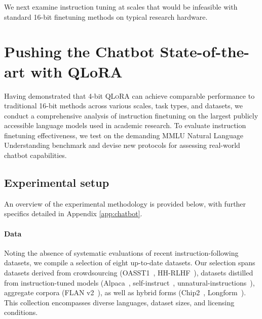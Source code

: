We next examine instruction tuning at scales that would be infeasible with standard 16-bit finetuning methods on typical research hardware.

\section{Pushing the Chatbot State-of-the-art with QLoRA}
\label{sec:pushing}
Having demonstrated that 4-bit \textsc{QLoRA} can achieve comparable performance to traditional 16-bit methods across various scales, task types, and datasets, we conduct a comprehensive analysis of instruction finetuning on the largest publicly accessible language models used in academic research. To evaluate instruction finetuning effectiveness, we test on the demanding MMLU Natural Language Understanding benchmark and devise new protocols for assessing real-world chatbot capabilities.

\subsection{Experimental setup} An overview of the experimental methodology is provided below, with further specifics detailed in Appendix \ref{app:chatbot}.

\paragraph{Data} Noting the absence of systematic evaluations of recent instruction-following datasets, we compile a selection of eight up-to-date datasets. Our selection spans datasets derived from crowdsourcing (OASST1~\citep{kopf2023openassistant}, HH-RLHF~\citep{bai2022training}), datasets distilled from instruction-tuned models (Alpaca~\citep{alpaca}, self-instruct~\citep{wang2022self}, unnatural-instructions~\citep{honovich2022unnatural}), aggregate corpora (FLAN v2~\citep{chung2022scaling}), as well as hybrid forms (Chip2~\citep{laion2023}, Longform~\citep{koksal2023longform}). This collection encompasses diverse languages, dataset sizes, and licensing conditions.

